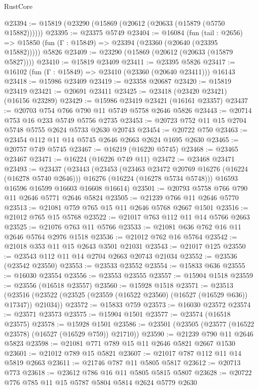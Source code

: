 \begin{lexlean}{RustCore}
\begin{coremodule}
@23394 := @15819 (@23290 (@15869 (@20612 (@20633 (@15879 (@5750 @15882))))))
@23395 := @23375 @5749
@23404 := @16084
    (fun (tail : @2656) => @15850 (fun (Γ : @15849) => @23394 (@23360 (@20640 (@23395 @15882)))))
    @5826
@23409 := @23290 (@15869 (@20612 (@20633 (@15879 @5827))))
@23410 := @15819 @23409
@23411 := @23395 @5826
@23417 := @16102 (fun (Γ : @15849) => @23410 (@23360 (@20640 @23411))) @16143
@23418 := @15986 @23409
@23419 := @23358 @20687
@23420 := @15819 @23419
@23421 := @20691 @23411
@23425 := @23418 (@23420 @23421) (@16156 @23289)
@23429 := @15986 @23419 @23421 (@16161 @23357)
@23437 := @20703 @754 @766 @790 @11 @5749 @5758 @2646 @5826
@23443 := @20714 @753 @16 @233 @5749 @5756 @2735
@23453 := @20723 @752 @11 @15 @2704 @5748 @5755 @2624 @5733 @2630 @20743
@23454 := @20722 @750
@23463 := @23454 @112 @11 @14 @5745 @2646 @2663 @2624 @1695 @2630
@23465 := @20757 @749 @5745
@23467 := @16219 (@16220 @5745)
@23468 := @23465 @23467
@23471 := @16224 (@16226 @749 @11)
@23472 := @23468 @23471
@23493 := @23437
    (@23443
      (@23453
        (@23463 @23472 @20769 @16276 (@16224 (@16278 @5740 @2646)))
        @16276
        (@16224 (@16278 @5734 @5748)))
      @16593
      @16596
      @16599
      @16603
      @16608
      @16614)
@23501 := @20793 @5758 @766 @790 @11 @2646 @5771 @2646 @5824
@23505 := @21239 @766 @11 @2646 @5770
@23513 := @21081 @759 @765 @15 @11 @2646 @5768 @2667 @1501
@23516 := @21012 @765 @15 @5768
@23522 := @21017 @763 @112 @11 @14 @5766 @2663
@23525 := @21076 @763 @11 @5766
@23533 := @21081 @636 @762 @16 @11 @2646 @5764 @2976 @1518
@23536 := @21012 @762 @16 @5764
@23542 := @21018 @353 @11 @15 @2643 @3501 @21031
@23543 := @21017 @125
@23550 := @23543 @112 @11 @14 @2704 @2663 @20743 @21034
@23552 := @23536 (@23542 @23550)
@23553 := @23533 @23552
@23554 := @15833 @636
@23555 := @16030 @23554
@23556 := @23553 @23555
@23557 := @15904 @1518
@23559 := @23556 (@16518 @23557)
@23560 := @15928 @1518
@23571 := @23513
    (@23516 (@23522 (@23525 (@23559 (@16522 @23560) (@16527 (@16529 @636)) @17347)) @21034))
@23572 := @15833 @759
@23573 := @16030 @23572
@23574 := @23571 @23573
@23575 := @15904 @1501
@23577 := @23574 (@16518 @23575)
@23578 := @15928 @1501
@23586 := @23501 (@23505 (@23577 (@16522 @23578) (@16527 (@16529 @759)) @21710))
@23590 := @21239 @790 @11 @2646 @5823
@23598 := @21081 @771 @789 @15 @11 @2646 @5821 @2667 @1530
@23601 := @21012 @789 @15 @5821
@23607 := @21017 @787 @112 @11 @14 @5819 @2663
@23611 := @21746 @787 @11 @5805 @5817
@23612 := @20713 @773
@23618 := @23612 @786 @16 @11 @5805 @5815 @5807
@23628 := @20722 @776 @785 @11 @15 @5787 @5804 @5814 @2624 @5779 @2630

\end{coremodule}
\end{lexlean}
